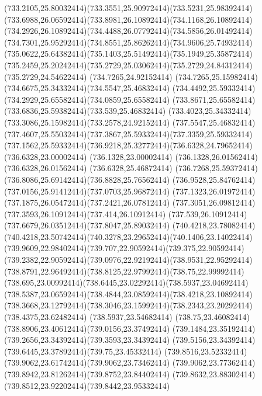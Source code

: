 {{	\curveto(733.2105,25.80032414)(733.3551,25.90972414)(733.5231,25.98392414)
	\curveto(733.6988,26.06592414)(733.8981,26.10892414)(734.1168,26.10892414)
	\curveto(734.2926,26.10892414)(734.4488,26.07792414)(734.5856,26.01492414)
	\curveto(734.7301,25.95292414)(734.8551,25.86262414)(734.9606,25.74932414)
	\curveto(735.0622,25.64382414)(735.1403,25.51492414)(735.1949,25.35872414)
	\curveto(735.2459,25.20242414)(735.2729,25.03062414)(735.2729,24.84312414)
	\lineto(735.2729,24.54622414)
	\closepath
	\moveto(734.7265,24.92152414)
	\curveto(734.7265,25.15982414)(734.6675,25.34332414)(734.5547,25.46832414)
	\curveto(734.4492,25.59332414)(734.2929,25.65582414)(734.0859,25.65582414)
	\curveto(733.8671,25.65582414)(733.6836,25.59382414)(733.539,25.46832414)
	\curveto(733.4023,25.34332414)(733.3086,25.15982414)(733.2578,24.92152414)
	\closepath
	\moveto(737.5547,25.46832414)
	\curveto(737.4607,25.55032414)(737.3867,25.59332414)(737.3359,25.59332414)
	\curveto(737.1562,25.59332414)(736.9218,25.32772414)(736.6328,24.79652414)
	\lineto(736.6328,23.00002414)
	\lineto(736.1328,23.00002414)
	\lineto(736.1328,26.01562414)
	\lineto(736.6328,26.01562414)
	\lineto(736.6328,25.46872414)
	\curveto(736.7268,25.59372414)(736.8086,25.69142414)(736.8828,25.76562414)
	\curveto(736.9528,25.84762414)(737.0156,25.91412414)(737.0703,25.96872414)
	\curveto(737.1323,26.01972414)(737.1875,26.05472414)(737.2421,26.07812414)
	\curveto(737.3051,26.09812414)(737.3593,26.10912414)(737.414,26.10912414)
	\curveto(737.539,26.10912414)(737.6679,26.03512414)(737.8047,25.89032414)
	\closepath
	\moveto(740.4218,23.78082414)
	\curveto(740.4218,23.50742414)(740.3278,23.29652414)(740.1406,23.14022414)
	\curveto(739.9609,22.98402414)(739.707,22.90592414)(739.375,22.90592414)
	\curveto(739.2382,22.90592414)(739.0976,22.92192414)(738.9531,22.95292414)
	\curveto(738.8791,22.96492414)(738.8125,22.97992414)(738.75,22.99992414)
	\curveto(738.695,23.00992414)(738.6445,23.02292414)(738.5937,23.04692414)
	\curveto(738.5387,23.06592414)(738.4844,23.08592414)(738.4218,23.10892414)
	\curveto(738.3668,23.12792414)(738.3046,23.15992414)(738.2343,23.20292414)
	\lineto(738.4375,23.62482414)
	\lineto(738.5937,23.54682414)
	\curveto(738.75,23.46082414)(738.8906,23.40612414)(739.0156,23.37492414)
	\curveto(739.1484,23.35192414)(739.2656,23.34392414)(739.3593,23.34392414)
	\curveto(739.5156,23.34392414)(739.6445,23.37892414)(739.75,23.45332414)
	\curveto(739.8516,23.52332414)(739.9062,23.61742414)(739.9062,23.73462414)
	\curveto(739.9062,23.77362414)(739.8942,23.81262414)(739.8752,23.84402414)
	\curveto(739.8632,23.88302414)(739.8512,23.92202414)(739.8442,23.95332414)
}}
